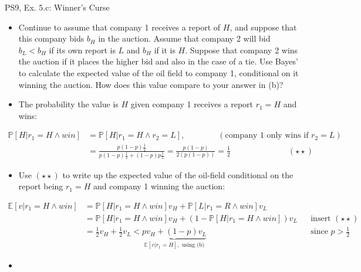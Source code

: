\begin{frame}{PS9, Ex. 5.c: Winner's Curse}
      \begin{itemize}
        \item[(c)] Continue to assume that company 1 receives a report of $H$, and suppose that this company bids $b_H$ in the auction. Assume that company 2 will bid $b_L < b_H$ if its own report is $L$ and $b_H$ if it is $H$. Suppose that company 2 wins the auction if it places the higher bid and also in the case of a tie. Use Bayes’ to calculate the expected value of the oil field to company 1, conditional on it winning the auction. How does this value compare to your answer in (b)?
        \item[Step 1:] The probability the value is $H$ given company 1 receives a report $r_1=H$ and wins:
        \end{itemize}
        \vspace{-10pt}
        \begin{align*}
          \mathbb{P}[H|r_1=H\wedge win]&=\mathbb{P}[H|r_1=H\wedge r_2=L],\quad\quad\quad\quad(\text{company 1 only wins if }r_2=L)\\
            &=\frac{p(1-p)\frac{1}{2}}{p(1-p)\frac{1}{2}+(1-p)p\frac{1}{2}}=\frac{p(1-p)}{2(p(1-p))}=\frac{1}{2}\quad\quad\quad\quad\quad\quad\quad(\star\star)
        \end{align*}
        \vspace{-12pt}
        \begin{itemize}
        \item[Step 2:] Use $(\star\star)$ to write up the expected value of the oil-field conditional on the report being $r_1=H$ and company 1 winning the auction:
      \end{itemize}
      \vspace{-8pt}
      \begin{align*}
        \mathbb{E}[v|r_1=H\wedge win]&=\mathbb{P}[H|r_1=H\wedge win]v_H+\mathbb{P}[L|r_1=R\wedge win]v_L\\
        &=\mathbb{P}[H|r_1=H\wedge win]v_H+\left(1-\mathbb{P}[H|r_1=H\wedge win]\right)v_L&&\text{insert }(\star\star)\\
        &=\frac{1}{2}v_H+\frac{1}{2}v_L<\underbrace{pv_H+(1-p)v_L}_{\textstyle\mathbb{E}[v|r_1=H],\text{ using (b)}}&&\text{since }p>\frac{1}{2}
      \end{align*}
      \vspace{-10pt}
      \begin{itemize}
        \item[Step 3:] 
      \end{itemize}
      \vfill\null
\end{frame}
